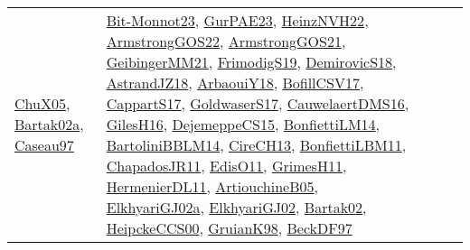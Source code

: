 {\begin{longtable}{lp{3cm}>{\raggedright}p{6cm}>{\raggedright}p{6cm}p{8cm}}
\href{papers/ChuX05.pdf}{ChuX05}\cite{ChuX05}, \href{papers/Bartak02a.pdf}{Bartak02a}\cite{Bartak02a}, \href{papers/Caseau97.pdf}{Caseau97}\cite{Caseau97} & \href{papers/Bit-Monnot23.pdf}{Bit-Monnot23}\cite{Bit-Monnot23}, \href{articles/GurPAE23.pdf}{GurPAE23}\cite{GurPAE23}, \href{articles/HeinzNVH22.pdf}{HeinzNVH22}\cite{HeinzNVH22}, \href{papers/ArmstrongGOS22.pdf}{ArmstrongGOS22}\cite{ArmstrongGOS22}, \href{papers/ArmstrongGOS21.pdf}{ArmstrongGOS21}\cite{ArmstrongGOS21}, \href{papers/GeibingerMM21.pdf}{GeibingerMM21}\cite{GeibingerMM21}, \href{papers/FrimodigS19.pdf}{FrimodigS19}\cite{FrimodigS19}, \href{papers/DemirovicS18.pdf}{DemirovicS18}\cite{DemirovicS18}, \href{papers/AstrandJZ18.pdf}{AstrandJZ18}\cite{AstrandJZ18}, \href{papers/ArbaouiY18.pdf}{ArbaouiY18}\cite{ArbaouiY18}, \href{papers/BofillCSV17.pdf}{BofillCSV17}\cite{BofillCSV17}, \href{papers/CappartS17.pdf}{CappartS17}\cite{CappartS17}, \href{papers/GoldwaserS17.pdf}{GoldwaserS17}\cite{GoldwaserS17}, \href{papers/CauwelaertDMS16.pdf}{CauwelaertDMS16}\cite{CauwelaertDMS16}, \href{papers/GilesH16.pdf}{GilesH16}\cite{GilesH16}, \href{papers/DejemeppeCS15.pdf}{DejemeppeCS15}\cite{DejemeppeCS15}, \href{papers/BonfiettiLM14.pdf}{BonfiettiLM14}\cite{BonfiettiLM14}, \href{papers/BartoliniBBLM14.pdf}{BartoliniBBLM14}\cite{BartoliniBBLM14}, \href{papers/CireCH13.pdf}{CireCH13}\cite{CireCH13}, \href{papers/BonfiettiLBM11.pdf}{BonfiettiLBM11}\cite{BonfiettiLBM11}, \href{papers/ChapadosJR11.pdf}{ChapadosJR11}\cite{ChapadosJR11}, \href{papers/EdisO11.pdf}{EdisO11}\cite{EdisO11}, \href{papers/GrimesH11.pdf}{GrimesH11}\cite{GrimesH11}, \href{papers/HermenierDL11.pdf}{HermenierDL11}\cite{HermenierDL11}, \href{papers/ArtiouchineB05.pdf}{ArtiouchineB05}\cite{ArtiouchineB05}, \href{papers/ElkhyariGJ02a.pdf}{ElkhyariGJ02a}\cite{ElkhyariGJ02a}, \href{papers/ElkhyariGJ02.pdf}{ElkhyariGJ02}\cite{ElkhyariGJ02}, \href{papers/Bartak02.pdf}{Bartak02}\cite{Bartak02}, \href{articles/HeipckeCCS00.pdf}{HeipckeCCS00}\cite{HeipckeCCS00}, \href{papers/GruianK98.pdf}{GruianK98}\cite{GruianK98}, \href{papers/BeckDF97.pdf}{BeckDF97}\cite{BeckDF97}\\

\end{longtable}}
